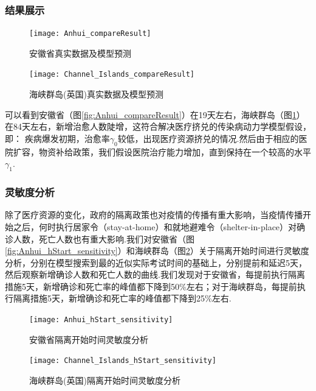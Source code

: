 \documentclass{whutmod}
\begin{document}
	\subsubsection{结果展示}
	\begin{figure}[!h]
		\begin{minipage}[t]{0.5\textwidth}
		\centering
		\texttt{[image: Anhui\_compareResult]}
		\caption{安徽省真实数据及模型预测}
		\label{fig:Anhui_compareResult}
		\end{minipage}
		\qquad
		\begin{minipage}[t]{0.5\textwidth}
		\centering
		\texttt{[image: Channel\_Islands\_compareResult]}
		\caption{海峡群岛(英国)真实数据及模型预测}
		\label{fig:Channel_Islands_compareResult}
		\end{minipage}
	\end{figure}
	可以看到安徽省（图\ref{fig:Anhui_compareResult}）在19天左右，海峡群岛（图\ref{fig:Channel_Islands_compareResult}）在84天左右，新增治愈人数陡增，这符合解决医疗挤兑的传染病动力学模型假设，即：
	疾病爆发初期，治愈率$\gamma_0$较低，出现医疗资源挤兑的情况.然后由于相应的医院扩容，物资补给政策，我们假设医院治疗能力增加，直到保持在一个较高的水平$\gamma_1$.
	
	\subsubsection{灵敏度分析}
	除了医疗资源的变化，政府的隔离政策也对疫情的传播有重大影响，当疫情传播开始之后，何时执行居家令（stay-at-home）和就地避难令（shelter-in-place）对确诊人数，死亡人数也有重大影响.我们对安徽省（图\ref{fig:Anhui_hStart_sensitivity}）和海峡群岛（图\ref{fig:Channel_Islands_hStart_sensitivity}）关于隔离开始时间进行灵敏度分析，分别在模型搜索到最的近似实际考试时间的基础上，分别提前和延迟5天，然后观察新增确诊人数和死亡人数的曲线.我们发现对于安徽省，每提前执行隔离措施5天，新增确诊和死亡率的峰值都下降到50\%左右；对于海峡群岛，每提前执行隔离措施5天，新增确诊和死亡率的峰值都下降到25\%左右.
	\begin{figure}[!h]
		\begin{minipage}[t]{0.5\textwidth}
		\centering
		\texttt{[image: Anhui\_hStart\_sensitivity]}
		\caption{安徽省隔离开始时间灵敏度分析}
		\label{fig:Anhui_hStart_sensitivity}
		\end{minipage}
		\qquad
		\begin{minipage}[t]{0.5\textwidth}
		\centering
		\texttt{[image: Channel\_Islands\_hStart\_sensitivity]}
		\caption{海峡群岛(英国)隔离开始时间灵敏度分析}
		\label{fig:Channel_Islands_hStart_sensitivity}
		\end{minipage}
	\end{figure}
\end{document}
